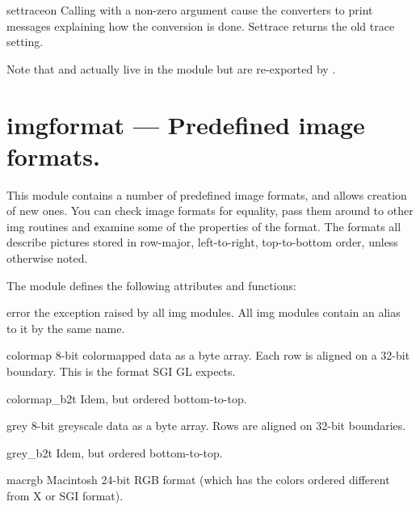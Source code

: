 \begin{funcdesc}{settrace}{on}
Calling  with a non-zero argument cause the converters
to print messages explaining how the conversion is done. Settrace
returns the old trace setting.
\end{funcdesc}

Note that  and  actually live in the
 module but are re-exported by .

\section{imgformat ---
	Predefined image formats.}

This module contains a number of predefined image formats, and allows
creation of new ones. You can check image formats for equality,
pass them around to other img routines and examine some of the
properties of the format. The formats all describe pictures stored in
row-major, left-to-right, top-to-bottom order, unless otherwise noted.

The module defines the following attributes and functions:

\begin{excdesc}{error}
the exception raised by all img modules. All img modules contain an
alias to it by the same name.
\end{excdesc}

\begin{datadesc}{colormap}
8-bit colormapped data as a byte array. Each
row is aligned on a 32-bit boundary. This is the format SGI GL
expects.
\end{datadesc}

\begin{datadesc}{colormap_b2t}
Idem, but ordered bottom-to-top.
\end{datadesc}

\begin{datadesc}{grey}
8-bit greyscale data as a byte array. Rows are
aligned on 32-bit boundaries.
\end{datadesc}

\begin{datadesc}{grey_b2t}
Idem, but ordered bottom-to-top.
\end{datadesc}

\begin{datadesc}{macrgb}
Macintosh 24-bit RGB format (which has the colors ordered different
from X or SGI format).
\end{datadesc}

